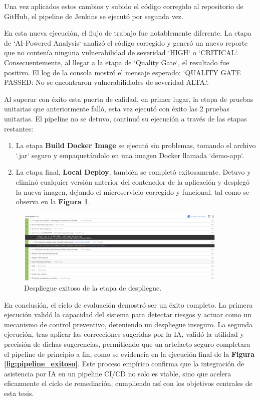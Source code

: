 Una vez aplicados estos cambios y subido el código corregido al repositorio de GitHub, el pipeline de Jenkins se ejecutó por segunda vez.

En esta nueva ejecución, el flujo de trabajo fue notablemente diferente. La etapa de `AI-Powered Analysis` analizó el código corregido y generó un nuevo reporte que no contenía ninguna vulnerabilidad de severidad `HIGH` o `CRITICAL`. Consecuentemente, al llegar a la etapa de `Quality Gate`, el resultado fue positivo. El log de la consola mostró el mensaje esperado: `QUALITY GATE PASSED: No se encontraron vulnerabilidades de severidad ALTA.`.

Al superar con éxito esta puerta de calidad, en primer lugar, la etapa de pruebas unitarias que anteriormente falló, esta vez ejecutó con éxito las 2 pruebas unitarias. El pipeline no se detuvo, continuó su ejecución a través de las etapas restantes:

\begin{enumerate}
    \item La etapa \textbf{Build Docker Image} se ejecutó sin problemas, tomando el archivo `.jar` seguro y empaquetándolo en una imagen Docker llamada `demo-app`.
    \item La etapa final, \textbf{Local Deploy}, también se completó exitosamente. Detuvo y eliminó cualquier versión anterior del contenedor de la aplicación y desplegó la nueva imagen, dejando el microservicio corregido y funcional, tal como se observa en la \textbf{Figura \ref{fig:deploy_exitoso}}.
\end{enumerate}

\begin{figure}[H]
    \centering
    \includegraphics[width=0.9\textwidth]{contenido/imagenes/4_deploy_ok.png}
    \caption{Despliegue exitoso de la etapa de despliegue.}
    \label{fig:deploy_exitoso}
\end{figure}

En conclusión, el ciclo de evaluación demostró ser un éxito completo. La primera ejecución validó la capacidad del sistema para detectar riesgos y actuar como un mecanismo de control preventivo, deteniendo un despliegue inseguro. La segunda ejecución, tras aplicar las correcciones sugeridas por la IA, validó la utilidad y precisión de dichas sugerencias, permitiendo que un artefacto seguro completara el pipeline de principio a fin, como se evidencia en la ejecución final de la \textbf{Figura \ref{fig:pipeline_exitoso}}. Este proceso empírico confirma que la integración de asistencia por IA en un pipeline CI/CD no solo es viable, sino que acelera eficazmente el ciclo de remediación, cumpliendo así con los objetivos centrales de esta tesis.

